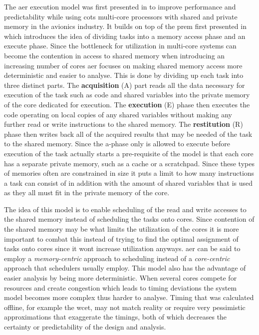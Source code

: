 \documentclass{kththesis}
\begin{document}
The \acrfull{aer} execution model was first presented in \parencite{durrieu_predictable_2014} to
improve performance and predictability while using \acrfull{cots} multi-core processors with shared
and private memory in the avionics industry. It builds on top of the \acrfull{prem} first presented
in \parencite{pellizzoni_predictable_2011} which introduces the idea of dividing tasks into a memory
access phase and an execute phase. Since the bottleneck for utilization in multi-core systems can
become the contention in access to shared memory when introducing an increasing number of cores
\acrshort{aer} focuses on making shared memory access more deterministic and easier to analyse. This
is done by dividing up each task into three distinct parts. The \textbf{acquisition} (A) part reads all
the data necessary for execution of the task such as code and shared variables into the private
memory of the core dedicated for execution. The \textbf{execution} (E) phase then executes the code
operating on local copies of any shared variables without making any further read or write
instructions to the shared memory. The \textbf{restitution} (R) phase then writes back all of the
acquired results that may be needed of the task to the shared memory. Since the \acrshort{a}-phase
only is allowed to execute before execution of the task actually starts a pre-requisite of the model
is that each core has a separate private memory, such as a cache or a scratchpad. Since these types
of memories often are constrained in size it puts a limit to how many instructions a task can
consist of in addition with the amount of shared variables that is used as they all must fit in
the private memory of the core.

The idea of this model is to enable scheduling of the read and write accesses to the shared memory
instead of scheduling the tasks onto cores. Since contention of the shared memory may be what limits
the utilization of the cores it is more important to combat this instead of trying to find the
optimal assignment of tasks onto cores since it wont increase utilization anyways. \acrshort{aer}
can be said to employ a \textit{memory-centric} approach to scheduling instead of a
\textit{core-centric} approach that schedulers usually employ. This model also has the advantage of
easier analysis by being more deterministic. When several cores compete for resources and create
congestion which leads to timing deviations the system model becomes more complex thus harder to
analyse. Timing that was calculated offline, for example the \acrshort{wcet}, may not match reality
or require very pessimistic approximations that exaggerate the timings, both of which decreases the
certainty or predictability of the design and analysis.
\end{document}
